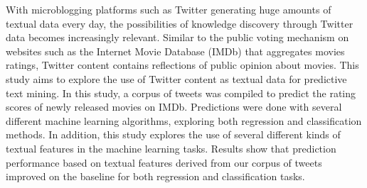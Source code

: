 With microblogging platforms such as Twitter generating huge amounts of textual data every day, the possibilities of knowledge discovery through Twitter data becomes increasingly relevant. Similar to the public voting mechanism on websites such as the Internet Movie Database (IMDb) that aggregates movies ratings, Twitter content contains reflections of public opinion about movies. This study aims to explore the use of Twitter content as textual data for predictive text mining. In this study, a corpus of tweets was compiled to predict the rating scores of newly released movies on IMDb. Predictions were done with several different machine learning algorithms, exploring both regression and classification methods. In addition, this study explores the use of several different kinds of textual features in the machine learning tasks. Results show that prediction performance based on textual features derived from our corpus of tweets improved on the baseline for both regression and classification tasks.

